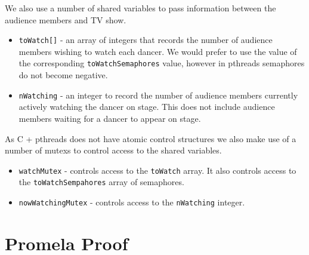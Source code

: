 \documentclass[12pt,a4paper]{scrartcl}
\begin{document}
We also use a number of shared variables to pass information between the audience members and TV show.
\begin{itemize}
    \item \texttt{toWatch[]} - an array of integers that records the number of audience members wishing to watch each dancer.
          We would prefer to use the value of the corresponding \texttt{toWatchSemaphores} value, however in pthreads semaphores do not become negative.
    \item \texttt{nWatching} - an integer to record the number of audience members currently actively watching the dancer on stage.
          This does not include audience members waiting for a dancer to appear on stage.
\end{itemize}

As C + pthreads does not have atomic control structures we also make use of a number of mutexs to control access to the shared variables.
\begin{itemize}
    \item \texttt{watchMutex} - controls access to the \texttt{toWatch} array.
          It also controls access to the \texttt{toWatchSempahores} array of semaphores.
    \item \texttt{nowWatchingMutex} - controls access to the \texttt{nWatching} integer.
\end{itemize}

\section{Promela Proof}
\end{document}
